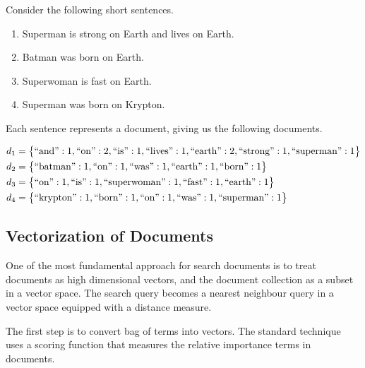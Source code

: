 	\begin{ex}
	\label{ex:superhero-documents}
		Consider the following short sentences.
		
		\begin{enumerate}
			\item Superman is strong on Earth and lives on Earth.
			\item Batman was born on Earth.
			\item Superwoman is fast on Earth.
			\item Superman was born on Krypton.
		\end{enumerate}
		
		Each sentence represents a document, giving us the following documents.
		
		\begin{align}
			d_1 &= \bigl\{\textrm{``and''}: 1, \textrm{``on''}: 2, \textrm{``is''}: 1, \textrm{``lives''}: 1, \textrm{``earth''}: 2, \textrm{``strong''}: 1, \textrm{``superman''}: 1\bigr\} \\
			d_2 &= \bigl\{\textrm{``batman''}: 1, \textrm{``on''}: 1, \textrm{``was''}: 1, \textrm{``earth''}: 1, \textrm{``born''}: 1\bigr\} \\
			d_3 &= \bigl\{\textrm{``on''}: 1, \textrm{``is''}: 1, \textrm{``superwoman''}: 1, \textrm{``fast''}: 1, \textrm{``earth''}: 1\bigr\} \\
			d_4 &= \bigl\{\textrm{``krypton''}: 1, \textrm{``born''}: 1, \textrm{``on''}: 1, \textrm{``was''}: 1, \textrm{``superman''}: 1\bigr\} \\
		\end{align}
	\end{ex}
	
	\subsection{Vectorization of Documents}
	\label{sec:vectorization-of-documents}
		One of the most fundamental approach for search documents is to treat documents as high dimensional vectors, and the document collection as a subset in a vector space.  The search query becomes a nearest neighbour query in a vector space equipped with a distance measure.
		
		The first step is to convert bag of terms into vectors.  The standard technique \cite{ir-08} uses a scoring function that measures the relative importance terms in documents.
		
